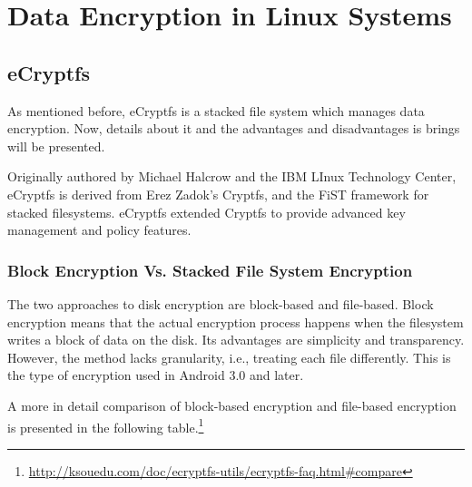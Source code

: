 \chapter{Data Encryption in Linux Systems}
\label{chapter:intro}

\section{eCryptfs}
\label{sec:de-ecryptfs}

As mentioned before, eCryptfs is a stacked file system which manages data encryption. Now, details about it and the advantages and disadvantages is brings will be presented.

Originally authored by Michael Halcrow and the IBM LInux Technology Center, eCryptfs is derived from Erez Zadok's Cryptfs, and the FiST framework for stacked filesystems. eCryptfs extended Cryptfs to provide advanced key management and policy features. 

\subsection{Block Encryption Vs. Stacked File System Encryption}
\label{sub-sec:be-vs-sfse}

The two approaches to disk encryption are block-based and file-based. Block encryption means that the actual encryption process happens when the filesystem writes a block of data on the disk. Its advantages are simplicity and transparency. However, the method lacks granularity, i.e., treating each file differently. This is the type of encryption used in Android 3.0 and later.

A more in detail comparison of block-based encryption and file-based encryption is presented in the following table.\footnote{\url{http://ksouedu.com/doc/ecryptfs-utils/ecryptfs-faq.html\#compare}}

